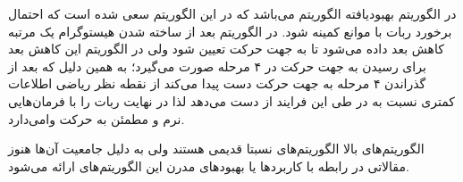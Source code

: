 در الگوریتم  بهبودیافته الگوریتم  می‌باشد که در این الگوریتم سعی شده است که احتمال برخورد ربات با موانع کمینه شود. در الگوریتم  بعد از ساخته شدن هیستوگرام یک مرتبه کاهش بعد داده می‌شود تا به جهت حرکت تعیین شود ولی در الگوریتم  این کاهش بعد برای رسیدن به جهت حرکت در ۴ مرحله صورت می‌گیرد؛ به همین دلیل که  بعد از گذراندن ۴ مرحله به جهت حرکت دست پیدا می‌کند از نقطه نظر ریاضی اطلاعات کمتری نسبت به  در طی این فرایند از دست می‌دهد لذا در نهایت ربات را با فرمان‌هایی نرم و مطمئن به حرکت وامی‌دارد.

الگوریتم‌های بالا الگوریتم‌های نسبتا قدیمی هستند ولی به دلیل جامعیت آن‌ها هنوز مقالاتی در رابطه با کاربردها یا بهبودهای مدرن این الگوریتم‌های ارائه می‌شود.